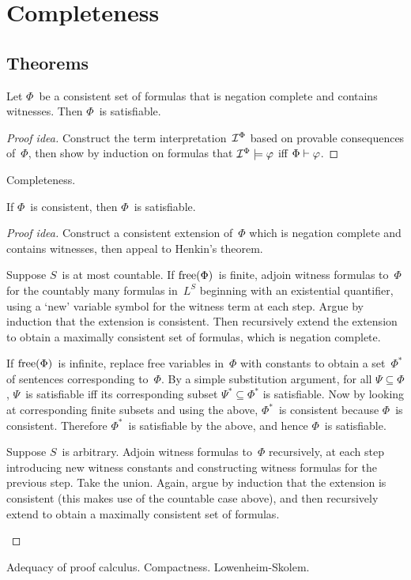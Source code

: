 %
%
%
\section{Completeness}
\subsection*{Theorems}
\begin{thm}[Henkin]
Let \(\Phi\)~be a consistent set of formulas that is negation complete and contains witnesses. Then \(\Phi\)~is satisfiable.
\end{thm}
\begin{proof}[Proof idea]
Construct the term interpretation~\(\mathcal{I}^{\Phi}\) based on provable consequences of~\(\Phi\), then show by induction on formulas that \(\mathcal{I}^{\Phi}\models\varphi\) iff \(\Phi\vdash\varphi\).
\end{proof}
\begin{app}
Completeness.
\end{app}

\begin{thm}[Completeness]
If \(\Phi\)~is consistent, then \(\Phi\)~is satisfiable.
\end{thm}
\begin{proof}[Proof idea]
Construct a consistent extension of~\(\Phi\) which is negation complete and contains witnesses, then appeal to Henkin's theorem.

\begin{ccse}
Suppose \(S\)~is at most countable. If \(\operatorname{free}(\Phi)\)~is finite, adjoin witness formulas to~\(\Phi\) for the countably many formulas in~\(L^S\) beginning with an existential quantifier, using a `new' variable symbol for the witness term at each step. Argue by induction that the extension is consistent. Then recursively extend the extension to obtain a maximally consistent set of formulas, which is negation complete.

If \(\operatorname{free}(\Phi)\)~is infinite, replace free variables in~\(\Phi\) with constants to obtain a set~\(\Phi^*\) of sentences corresponding to~\(\Phi\). By a simple substitution argument, for all \(\Psi\subseteq\Phi\), \(\Psi\)~is satisfiable iff its corresponding subset \(\Psi^*\subseteq\Phi^*\) is satisfiable. Now by looking at corresponding finite subsets and using the above, \(\Phi^*\)~is consistent because \(\Phi\)~is consistent. Therefore \(\Phi^*\)~is satisfiable by the above, and hence \(\Phi\)~is satisfiable.
\end{ccse}
\begin{gcse}
Suppose \(S\)~is arbitrary. Adjoin witness formulas to~\(\Phi\) recursively, at each step introducing new witness constants and constructing witness formulas for the previous step. Take the union. Again, argue by induction that the extension is consistent (this makes use of the countable case above), and then recursively extend to obtain a maximally consistent set of formulas.
\end{gcse}
\end{proof}
\begin{app}
Adequacy of proof calculus. Compactness. Lowenheim-Skolem.
\end{app}

